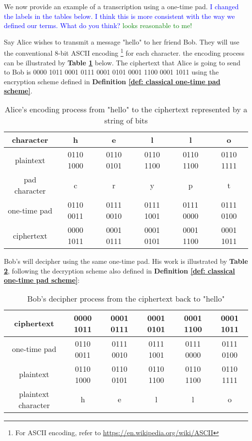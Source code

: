 We now provide an example of a transcription using a one-time pad.
\textcolor{blue}{I changed the labels in the tables below.  I think this is more consistent with the way we defined our terms.  What do you think?} \textcolor{green}{looks reasonable to me!}
\begin{example}
\label{example one-time pad}
Say Alice wishes to transmit a message "hello" to her friend Bob.  They will use the conventional 8-bit ASCII encoding \footnote{For ASCII encoding, refer to \url{https://en.wikipedia.org/wiki/ASCII}} for each character.  the encoding process can be illustrated by \textbf{Table  \ref{table: one-time pad encoding}} below. The ciphertext that Alice is going to send to Bob is 0000 1011 0001 0111 0001 0101 0001 1100 0001 1011 using the encryption scheme defined in \textbf{Definition \ref{def: classical one-time pad scheme}}.

\begin{table}[h]
\centering 
\begin{tabular}{|c|c|c|c|c|c|}
\hline
character & h & e & l & l & o \\ \hline
plaintext & 0110 1000 & 0110 0101 & 0110 1100 & 0110 1100 & 0110 1111 \\ \hline
pad character & c & r & y & p & t \\ \hline
one-time pad & 0110 0011 & 0111 0010 & 0111 1001 & 0111 0000 & 0111 0100 \\ \hline
ciphertext & 0000 1011 & 0001 0111 & 0001 0101 & 0001 1100 & 0001 1011 \\ \hline
\end{tabular}
\caption{Alice's encoding process from "hello" to the ciphertext represented by a string of bits}
\label{table: one-time pad encoding}
\end{table}

Bob's will decipher using the same one-time pad.   His work is illustrated by \textbf{Table \ref{table: one-time pad decoding}}, following the decryption scheme also defined in \textbf{Definition \ref{def: classical one-time pad scheme}}:
\begin{table}[h] 
\centering
\begin{tabular}{|c|c|c|c|c|c|}
\hline
ciphertext & 0000 1011 & 0001 0111 & 0001 0101 & 0001 1100 & 0001 1011 \\ \hline
one-time pad & 0110 0011 & 0111 0010 & 0111 1001 & 0111 0000 & 0111 0100 \\ \hline
plaintext & 0110 1000 & 0110 0101 & 0110 1100 & 0110 1100 & 0110 1111 \\ \hline
plaintext character & h & e & l & l & o \\ \hline
\end{tabular}
\caption{Bob's decipher process from the ciphertext back to "hello"}
\label{table: one-time pad decoding}
\end{table}
\end{example}




